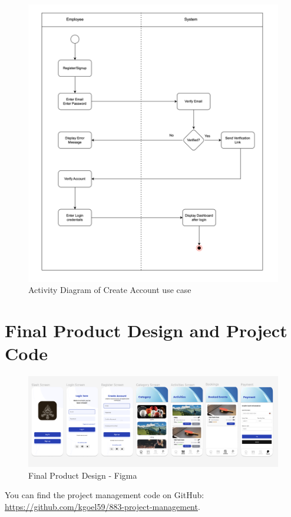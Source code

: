 \begin{figure}[h!t]
    \centering
    \includegraphics[width=\textwidth]{images/activityCreateAccount.png}
    \caption{Activity Diagram of Create Account use case}
    \label{fig:activityCreateAccount}
\end{figure}

\FloatBarrier

\section{Final Product Design and Project Code}

\begin{figure}[h!t]
    \centering
    \includegraphics[width=\textwidth]{images/Design.png}
    \caption{Final Product Design - Figma}
    \label{fig:finalproductdesign}
\end{figure}

You can find the project management code on GitHub: \url{https://github.com/kgoel59/883-project-management}.




\FloatBarrier
\newpage